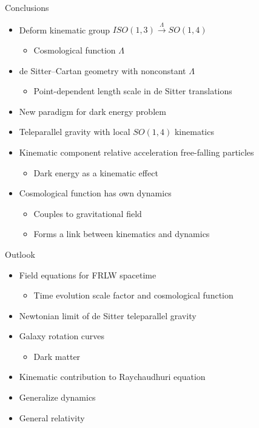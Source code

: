 \documentclass[t,hyperref={bookmarks=false}]{beamer}
\newcommand{\bitem}{\begin{itemize}}
\newcommand{\eitem}{\end{itemize}}
\begin{document}
\begin{frame}{Conclusions}

\bitem
\item Deform kinematic group $ISO(1,3) 
  \overset{\Lambda}{\longrightarrow} SO(1,4)$
  \bitem
  \item Cosmological function $\Lambda$
  \eitem
\item<2-> de Sitter--Cartan geometry with nonconstant $\Lambda$ 
  \bitem
  \item Point-dependent length scale in de Sitter translations
  \eitem
\item<3-> New paradigm for dark energy problem
\eitem

\bitem
\item<4-> Teleparallel gravity with local $SO(1,4)$ kinematics
\item<4-> Kinematic component relative acceleration free-falling
  particles
  \bitem
  \item Dark energy as a kinematic effect
  \eitem
\item<4-> Cosmological function has own dynamics
  \bitem
  \item Couples to gravitational field
  \item Forms a link between kinematics and dynamics
  \eitem
\eitem
\end{frame}

\begin{frame}{Outlook}

\bitem
\item Field equations for FRLW spacetime
  \bitem
  \item Time evolution scale factor and cosmological function
  \eitem
\eitem

\bitem
\item<2-> Newtonian limit of de Sitter teleparallel gravity
\item<3-> Galaxy rotation curves
  \bitem
  \item Dark matter
  \eitem
\eitem

\bitem
\item<4-> Kinematic contribution to Raychaudhuri equation
\eitem

\bitem
\item<5-> Generalize dynamics
\eitem

\bitem
\item<6-> General relativity
\eitem
\end{frame}
\end{document}
